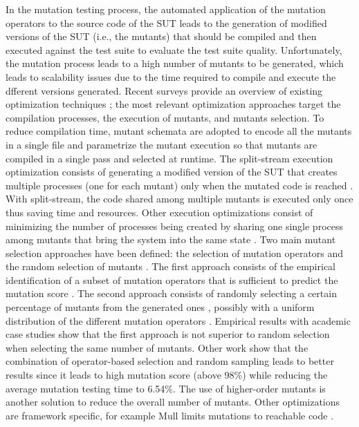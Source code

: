 In the mutation testing process, the automated application of the mutation operators to the source code of the SUT leads to the generation of modified versions of the SUT (i.e., the mutants) that should be compiled and then executed against the test suite to evaluate the test suite quality. Unfortunately, the mutation process leads to a high number of mutants to be generated, which leads to scalability issues due to the time required to compile and execute the dfferent versions generated. Recent surveys provide an overview of existing optimization techniques \cite{ferrari2018systematic}; the most relevant optimization approaches target the compilation processes, the execution of mutants, and mutants selection. To reduce compilation time, mutant schemata \cite{untch1993mutation} are adopted to encode all the mutants in a single file and parametrize the mutant execution so that mutants are compiled in a single pass and selected at runtime. The split-stream execution optimization consists of generating a modified version of the SUT that creates multiple processes (one for each mutant) only when the mutated code is reached \cite{tokumoto2016muvm}. With split-stream, the code shared among multiple mutants is executed only once thus saving time and resources. Other execution optimizations consist of minimizing the number of processes being created by sharing one single process among mutants that bring the system into the same state \cite{wang2017faster}.
Two main mutant selection approaches have been defined: the selection of mutation operators and the random selection of mutants \cite{zhang2010operator}. The first approach consists of the empirical identification of a subset of mutation operators that is sufficient to predict the mutation score \cite{siami2008sufficient,barbosa2001toward}. The second approach consists of randomly selecting a certain percentage of mutants from the generated ones \cite{wong1995reducing}, possibly with a uniform distribution of the different mutation operators \cite{zhang2010operator}. Empirical results with academic case studies \cite{zhang2010operator} show that the first approach is not superior to random selection when selecting the same number of mutants. Other work \cite{zhang2013operator} show that the combination of operator-based selection and random sampling leads to better results since it leads to high mutation score (above 98\%) while reducing the average mutation testing time to 6.54\%. The use of higher-order mutants is another solution to reduce the overall number of mutants. Other optimizations are framework specific, for example Mull limits mutations to reachable code \cite{hariri2018srciror}.
